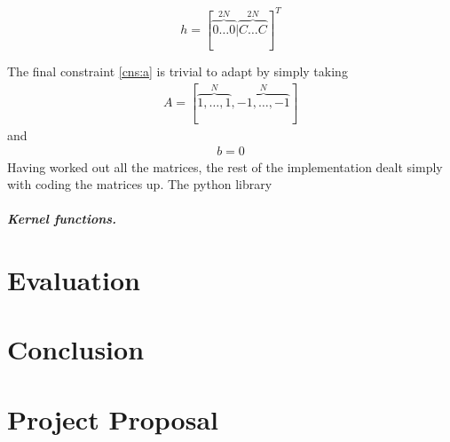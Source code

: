 \documentclass[12pt,twoside,notitlepage]{report}
\begin{document}
\[h = [\overbrace{0 \dots 0}^{2N}|\overbrace{C \dots C}^{2N}]^T\]

The final constraint \ref{cns:a} is trivial to adapt by simply taking 
\begin{gather*}
A=[\overbrace{1,\dots,1}^N,\overbrace{-1,\dots,-1}^N]
\end{gather*}
and
\begin{gather*}
b=0
\end{gather*}
Having worked out all the matrices, the rest of the implementation dealt simply
with coding the matrices up.
The python library 

\paragraph{Kernel functions.}
\cleardoublepage
\chapter{Evaluation}

\cleardoublepage
\chapter{Conclusion}
\cleardoublepage



\cleardoublepage

\appendix

\chapter{Project Proposal}

%
\end{document}
